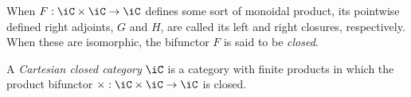 \documentclass{amsart}
\begin{document}
When $F : \iC \times \iC \to \iC$ defines some sort of monoidal product, its pointwise defined right adjoints, $G$ and $H$, are called its left and right closures, respectively.
When these are isomorphic, the bifunctor $F$ is said to be \emph{closed}.

\begin{defn}
  A \emph{Cartesian closed category} $\iC$ is a category with finite products in which the product bifunctor $\times : \iC \times \iC \to \iC$ is closed.
\end{defn}



\end{document}

